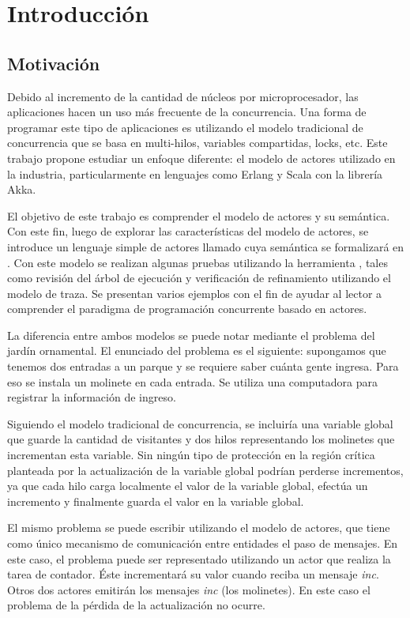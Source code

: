 \chapter{Introducción}

\section{Motivación}

Debido al incremento de la cantidad de núcleos por microprocesador, las aplicaciones hacen un uso más frecuente de la concurrencia. Una forma de programar este tipo de aplicaciones es utilizando el modelo tradicional de concurrencia que se basa en multi-hilos, variables compartidas, locks, etc. Este trabajo propone estudiar un enfoque diferente: el modelo de actores utilizado en la industria, particularmente en lenguajes como Erlang\cite{Cesarini:2009:EP:1717841, Armstrong:1996:CPE:229883} y Scala\cite{scala-overview-tech-report} con la librería Akka\cite{Wyatt:2013:AC:2663429}. 

El objetivo de este trabajo es comprender el modelo de actores y su semántica. Con este fin, luego de explorar las características del modelo de actores, se introduce un lenguaje simple de actores llamado \SAL cuya semántica se formalizará en \CSP. Con este modelo se realizan algunas pruebas utilizando la herramienta \FDR, tales como revisión del árbol de ejecución y verificación de refinamiento utilizando el modelo de traza. Se presentan varios ejemplos con el fin de ayudar al lector a comprender el paradigma de programación concurrente basado en actores.

La diferencia entre ambos modelos se puede notar mediante el problema del jardín ornamental. El enunciado del problema es el siguiente: supongamos que tenemos dos entradas a un parque y se requiere saber cuánta gente ingresa. Para eso se instala un molinete en cada entrada. Se utiliza una computadora para registrar la información de ingreso.

Siguiendo el modelo tradicional de concurrencia, se incluiría una variable global que guarde la cantidad de visitantes y dos hilos representando los molinetes que incrementan esta variable. Sin ningún tipo de protección en la región crítica planteada por la actualización de la variable global podrían perderse incrementos, ya que cada hilo carga localmente el valor de la variable global, efectúa un incremento y finalmente guarda el valor en la variable global. 

El mismo problema se puede escribir utilizando el modelo de actores, que tiene como único mecanismo de comunicación entre entidades el paso de mensajes. En este caso, el problema puede ser representado utilizando un actor que realiza la tarea de contador. Éste incrementará su valor cuando reciba un mensaje \emph{inc}. Otros dos actores emitirán los mensajes \emph{inc} (los molinetes). En este caso el problema de la pérdida de la actualización no ocurre.

